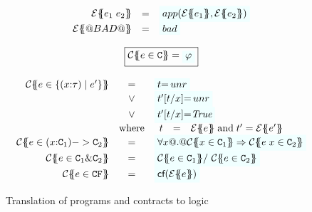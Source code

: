 \begin{figure}
\[\begin{array}{c}
\begin{array}{rcl}
\etrans{\Sigma}{\Gamma}{e_1\;e_2} & = & \formula{app(\etrans{\Sigma}{\Gamma}{e_1},
                                                     \etrans{\Sigma}{\Gamma}{e_2})} \\
\etrans{\Sigma}{\Gamma}{@BAD@} & = & \formula{\bad}
\end{array}
\\ \\
\ruleform{\ctrans{\Sigma}{\Gamma}{e \in \Ct} = \formula{\phi}} \\ \\
\begin{array}{rcl}
\ctrans{\Sigma}{\Gamma}{e \in \{(x{:}\tau) \mid e' \}}
  & = & \formula{t{=}\unr} \\
  & \lor & \formula{t'[t/x]{=}\unr} \\
  & \lor & \formula{t'[t/x]{=}\True} \\
  & \mbox{where} &
    \begin{array}[t]{rcl}
      t  & = & \etrans{\Sigma}{\Gamma}{e} \; \text{and} \; t' = \etrans{\Sigma}{\Gamma}{e'}
    \end{array}
\\
\ctrans{\Sigma}{\Gamma}{e \in (x{:}\Ct_1) -> \Ct_2}
  & = & \formula{\forall x @.@ \ctrans{\Sigma}{\Gamma,x}{x \in \Ct_1}
                          \Rightarrow \ctrans{\Sigma}{\Gamma,x}{e\;x \in \Ct_2}}
\\
\ctrans{\Sigma}{\Gamma}{e \in \Ct_1 \& \Ct_2}
   & = & \formula{ \ctrans{\Sigma}{\Gamma}{e \in \Ct_1} /\ \ctrans{\Sigma}{\Gamma}{e \in \Ct_2}}
\\
\ctrans{\Sigma}{\Gamma}{e \in \CF} & = & \formula{\lcf{\etrans{\Sigma}{\Gamma}{e}}}
\end{array}
\end{array}\]
\caption{Translation of programs and contracts to logic}
   \label{fig:etrans}\label{fig:contracts-minless}
\end{figure}

